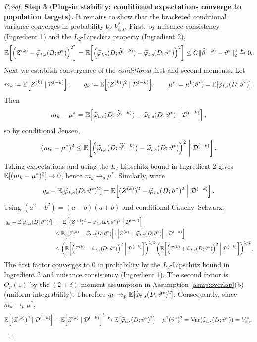 \documentclass{article}
\begin{document}
\begin{proof}
\textbf{Step 3 (Plug-in stability: conditional expectations converge to population targets).}
It remains to show that the bracketed conditional variance converges in probability to $V^*_{t,s}$.
First, by nuisance consistency (Ingredient 1) and the $L_2$-Lipschitz property (Ingredient 2),
\[
\operatorname{\mathbb{E}}\!\left[\left(Z^{(k)}-\widetilde{\varphi}_{t,s}(D;\vartheta^*)\right)^2\right]
=
\operatorname{\mathbb{E}}\!\left[\left(\widetilde{\varphi}_{t,s}(D;\widehat{\vartheta}^{(-k)})-\widetilde{\varphi}_{t,s}(D;\vartheta^*)\right)^2\right]
\le C\|\widehat{\vartheta}^{(-k)}-\vartheta^*\|_2^2
\xrightarrow{p}0.
\]
Next we establish convergence of the \emph{conditional} first and second moments.
Let
\[
m_k \coloneqq \operatorname{\mathbb{E}}\!\left[Z^{(k)}\mid \mathcal{D}^{(-k)}\right],
\qquad
q_k \coloneqq \operatorname{\mathbb{E}}\!\left[(Z^{(k)})^2\mid \mathcal{D}^{(-k)}\right],
\qquad
\mu^* \coloneqq \mu^1(\vartheta^*)=\operatorname{\mathbb{E}}[\widetilde{\varphi}_{t,s}(D;\vartheta^*)].
\]
Then
\[
m_k-\mu^*
=
\operatorname{\mathbb{E}}\!\left[\widetilde{\varphi}_{t,s}(D;\widehat{\vartheta}^{(-k)})-\widetilde{\varphi}_{t,s}(D;\vartheta^*)\;\middle|\;\mathcal{D}^{(-k)}\right],
\]
so by conditional Jensen,
\[
(m_k-\mu^*)^2
\le
\operatorname{\mathbb{E}}\!\left[\left(\widetilde{\varphi}_{t,s}(D;\widehat{\vartheta}^{(-k)})-\widetilde{\varphi}_{t,s}(D;\vartheta^*)\right)^2\;\middle|\;\mathcal{D}^{(-k)}\right].
\]
Taking expectations and using the $L_2$-Lipschitz bound in Ingredient 2 gives $\operatorname{\mathbb{E}}[(m_k-\mu^*)^2]\to 0$, hence $m_k\to_p \mu^*$.
Similarly, write
\[
q_k-\operatorname{\mathbb{E}}[\widetilde{\varphi}_{t,s}(D;\vartheta^*)^2]
=
\operatorname{\mathbb{E}}\!\left[(Z^{(k)})^2-\widetilde{\varphi}_{t,s}(D;\vartheta^*)^2\;\middle|\;\mathcal{D}^{(-k)}\right].
\]
Using $(a^2-b^2)=(a-b)(a+b)$ and conditional Cauchy--Schwarz,
\[
\begin{aligned}
|q_k-\operatorname{\mathbb{E}}[\widetilde{\varphi}_{t,s}(D;\vartheta^*)^2]|
&=
\left|
\operatorname{\mathbb{E}}\!\left[(Z^{(k)})^2-\widetilde{\varphi}_{t,s}(D;\vartheta^*)^2\;\middle|\;\mathcal{D}^{(-k)}\right]
\right| \\
&\le
\operatorname{\mathbb{E}}\!\left[\left|Z^{(k)}-\widetilde{\varphi}_{t,s}(D;\vartheta^*)\right|\cdot\left|Z^{(k)}+\widetilde{\varphi}_{t,s}(D;\vartheta^*)\right|\;\middle|\;\mathcal{D}^{(-k)}\right] \\
&\le
\left(
\operatorname{\mathbb{E}}\!\left[\left(Z^{(k)}-\widetilde{\varphi}_{t,s}(D;\vartheta^*)\right)^2\;\middle|\;\mathcal{D}^{(-k)}\right]
\right)^{1/2}
\left(
\operatorname{\mathbb{E}}\!\left[\left(Z^{(k)}+\widetilde{\varphi}_{t,s}(D;\vartheta^*)\right)^2\;\middle|\;\mathcal{D}^{(-k)}\right]
\right)^{1/2}.
\end{aligned}
\]
The first factor converges to 0 in probability by the $L_2$-Lipschitz bound in Ingredient 2 and nuisance consistency (Ingredient 1).
The second factor is $O_p(1)$ by the $(2+\delta)$ moment assumption in Assumption \ref{asmp:overlap}(b) (uniform integrability).
Therefore $q_k\to_p \operatorname{\mathbb{E}}[\widetilde{\varphi}_{t,s}(D;\vartheta^*)^2]$.
Consequently, since $m_k\to_p \mu^*$,
\[
\operatorname{\mathbb{E}}\!\left[(Z^{(k)})^2\mid \mathcal{D}^{(-k)}\right]
-
\operatorname{\mathbb{E}}\!\left[Z^{(k)}\mid \mathcal{D}^{(-k)}\right]^2
\xrightarrow{p}
\operatorname{\mathbb{E}}\!\left[\widetilde{\varphi}_{t,s}(D;\vartheta^*)^2\right]-\mu^1(\vartheta^*)^2
=
\operatorname{Var}\!\left(\widetilde{\varphi}_{t,s}(D;\vartheta^*)\right)
=V^*_{t,s}.
\]


\end{proof}
\end{document}
